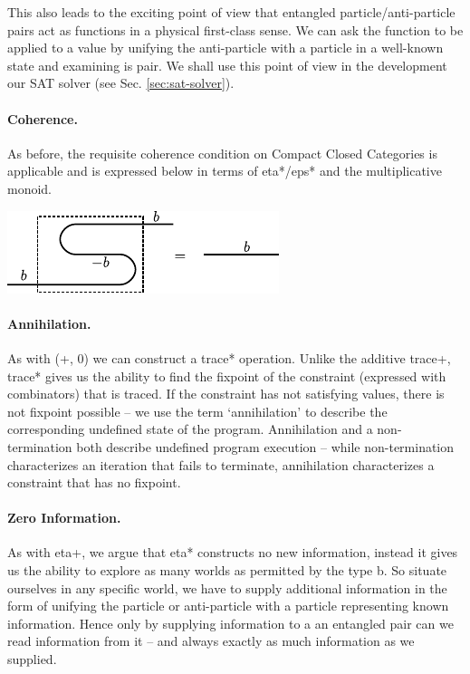 \documentclass[preprint]{sigplanconf}
\begin{document}
{This also leads to the exciting point of view that entangled
particle/anti-particle pairs act as functions in a physical
first-class sense. We can ask the function to be applied to a value by
unifying the anti-particle with a particle in a well-known state and
examining is pair. We shall use this point of view in the development
our SAT solver (see Sec. \ref{sec:sat-solver}).

\paragraph*{Coherence.} 
As before, the requisite coherence condition on Compact Closed
Categories is applicable and is expressed below in terms of
{{eta*}}/{{eps*}} and the multiplicative monoid.

\begin{center}
  \includegraphics{diagrams/coherence.pdf}
\end{center}

\paragraph*{Annihilation.}
As with {{(+, 0)}} we can construct a {{trace*}} operation. Unlike the
additive {{trace+}}, {{trace*}} gives us the ability to find the
fixpoint of the constraint (expressed with combinators) that is
traced. If the constraint has not satisfying values, there is not
fixpoint possible -- we use the term `annihilation' to describe the
corresponding undefined state of the program. Annihilation and a
non-termination both describe undefined program execution -- while
non-termination characterizes an iteration that fails to terminate,
annihilation characterizes a constraint that has no fixpoint. 

\paragraph*{Zero Information.}
As with {{eta+}}, we argue that {{eta*}} constructs no new
information, instead it gives us the ability to explore as many worlds
as permitted by the type {{b}}. So situate ourselves in any specific
world, we have to supply additional information in the form of
unifying the particle or anti-particle with a particle representing
known information. Hence only by supplying information to a an
entangled pair can we read information from it -- and always exactly
as much information as we supplied.

}
\end{document}
